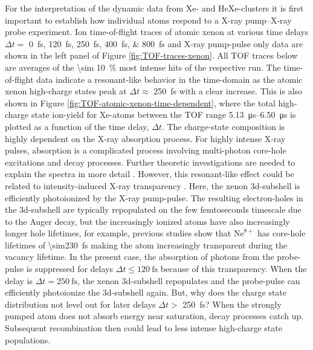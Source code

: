 For the interpretation of the dynamic data from Xe- and HeXe-clusters it is first important to establish how individual atoms respond to a X-ray pump--X-ray probe experiment. Ion time-of-flight traces of atomic xenon at various time delays $\Delta t =$ \SIlist{0;120;250;400;800}{\femto\second} and X-ray pump-pulse only data are shown in the left panel of Figure \ref{fig:TOF-traces-xenon}. All TOF traces below are averages of the \SI{\sim 10}{\percent} most intense hits of the respective run. The time-of-flight data indicate a resonant-like behavior in the time-domain as the atomic xenon high-charge states peak at $\Delta t\approx$ \SI{250}{\femto\second} with a clear increase. This is also shown in Figure \ref{fig:TOF-atomic-xenon-time-dependent}, where the total high-charge state ion-yield for Xe-atoms between the TOF range \SIrange{5.13}{6.50}{\micro\second} is plotted as a function of the time delay, $\Delta t$. The charge-state composition is highly dependent on the X-ray absorption process. For highly intense X-ray pulses, absorption is a complicated process involving multi-photon core-hole excitations and decay processes. Further theoretic investigations are needed to explain the spectra in more detail \cite{Ho-2014-PRL,Ho-2016-PC}. However, this resonant-like effect could be related to intensity-induced X-ray transparency \citep{Young-2010-Nature,Schorb-2012-PRL}. Here, the xenon 3d-subshell is efficiently photoionized by the X-ray pump-pulse. The resulting electron-holes in the 3d-subshell are typically repopulated on the few femtoseconds timescale due to the Auger decay, but the increasingly ionized atoms have also increasingly longer hole lifetimes, for example, previous studies show that $\text{Ne}^{8+}$ has core-hole lifetimes of \SI{\sim230}{\femto\second} \cite{Young-2010-Nature} making the atom increasingly transparent during the vacancy lifetime. In the present case, the absorption of photons from the probe-pulse is suppressed for delays $\Delta t \leq \SI{120}{\femto\second}$ because of this transparency. When the delay is $\Delta t = \SI{250}{\femto\second}$, the xenon 3d-subshell repopulates and the probe-pulse can efficiently photoionize the 3d-subshell again. But, why does the charge state distribution not level out for later delays $\Delta t >$ \SI{250}{\femto\second}? When the strongly pumped atom does not absorb energy near saturation, decay processes catch up. Subsequent recombination then could lead to less intense high-charge state populations.\\[1\baselineskip]

